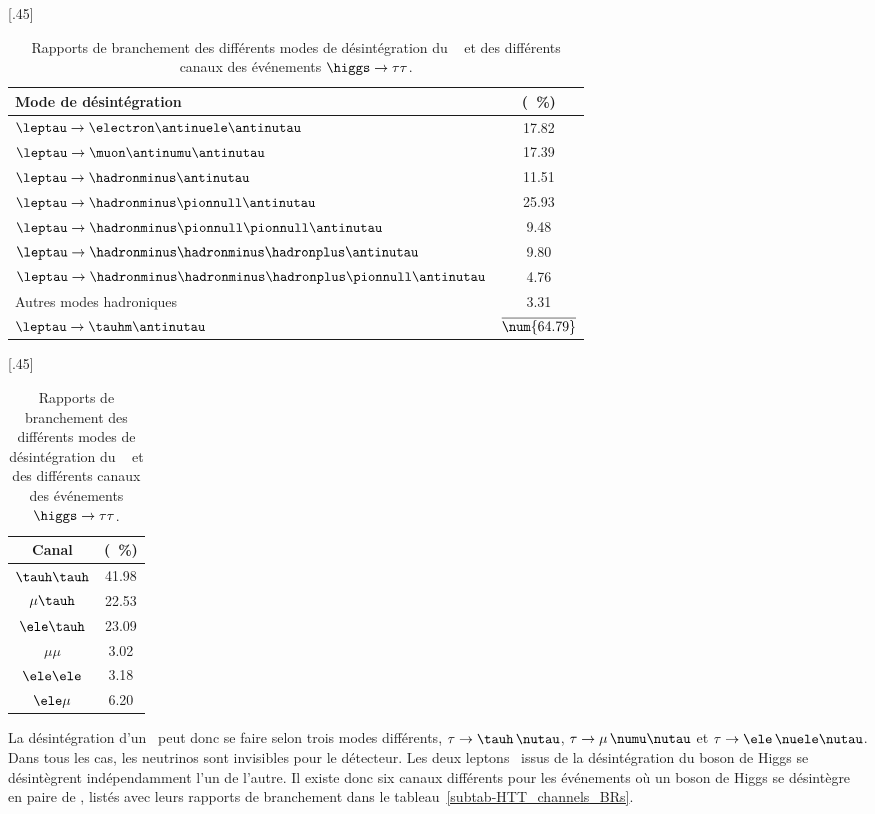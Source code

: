 \begin{table}[h]
\centering
{}[.45\textwidth]
{\begin{tabular}{lc}
\toprule
Mode de désintégration & \BR{} (\SI{}{\%})\\
\midrule
$\leptau\to \electron\antinuele\antinutau$ & \num{17.82} \\
$\leptau\to \muon\antinumu\antinutau$ & \num{17.39} \\
\midrule
$\leptau\to \hadronminus \antinutau$ & \num{11.51} \\
$\leptau\to \hadronminus \pionnull \antinutau$ & \num{25.93} \\
$\leptau\to \hadronminus \pionnull\pionnull \antinutau$ & \num{9.48} \\
$\leptau\to \hadronminus \hadronminus\hadronplus \antinutau$ & \num{9.80} \\
$\leptau\to \hadronminus \hadronminus\hadronplus\pionnull\antinutau$ & \num{4.76} \\
Autres modes hadroniques & \num{3.31} \\
$\leptau\to \tauhm \antinutau$ & $\overline{\text{\num{64.79}}}$ \\
\bottomrule
\end{tabular}}
\hfill
{}[.45\textwidth]
{\begin{tabular}{cc}
\toprule
Canal & \BR{} (\SI{}{\%})\\
\midrule
$\tauh\tauh$ & \num{41.98} \\
$\mu\tauh$ & \num{22.53} \\
$\ele\tauh$ & \num{23.09} \\
$\mu\mu$ & \num{3.02} \\
$\ele\ele$ & \num{3.18} \\
$\ele\mu$ & \num{6.20} \\
\bottomrule
\end{tabular}}
\caption[Rapports de branchement des événements $\higgs\to\tau\tau$.]{Rapports de branchement des différents modes de désintégration du \tau~\cite{PDG_booklet_2020} et des différents canaux des événements $\higgs\to\tau\tau$.}
\label{tab-tau_decay_and_HTT_channels_BRs}
\end{table}
\par La désintégration d'un \tau\ peut donc se faire selon trois modes différents, $\tau\to\tauh\,\nutau$, $\tau\to\mu\,\numu\nutau$ et $\tau\to\ele\,\nuele\nutau$.
Dans tous les cas, les neutrinos sont invisibles pour le détecteur.
Les deux leptons \tau\ issus de la désintégration du boson de Higgs se désintègrent indépendamment l'un de l'autre.
Il existe donc six canaux différents pour les événements où un boson de Higgs se désintègre en paire de \tau, listés avec leurs rapports de branchement dans le tableau~\ref{subtab-HTT_channels_BRs}.
